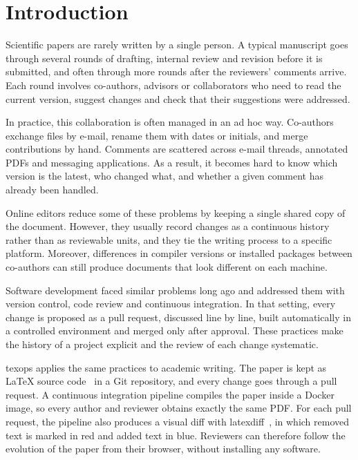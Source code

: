 \section{Introduction}
\label{sec:introduction}

Scientific papers are rarely written by a single person.
A typical manuscript goes through several rounds of drafting, internal review and revision before it is submitted, and often through more rounds after the reviewers' comments arrive.
Each round involves co-authors, advisors or collaborators who need to read the current version, suggest changes and check that their suggestions were addressed.

In practice, this collaboration is often managed in an ad hoc way.
Co-authors exchange files by e-mail, rename them with dates or initials, and merge contributions by hand.
Comments are scattered across e-mail threads, annotated PDFs and messaging applications.
As a result, it becomes hard to know which version is the latest, who changed what, and whether a given comment has already been handled.

Online editors reduce some of these problems by keeping a single shared copy of the document.
However, they usually record changes as a continuous history rather than as reviewable units, and they tie the writing process to a specific platform.
Moreover, differences in compiler versions or installed packages between co-authors can still produce documents that look different on each machine.

Software development faced similar problems long ago and addressed them with version control, code review and continuous integration.
In that setting, every change is proposed as a pull request, discussed line by line, built automatically in a controlled environment and merged only after approval.
These practices make the history of a project explicit and the review of each change systematic.

texops applies the same practices to academic writing.
The paper is kept as \LaTeX{} source code~\cite{lamport1994latex} in a Git repository, and every change goes through a pull request.
A continuous integration pipeline compiles the paper inside a Docker image, so every author and reviewer obtains exactly the same PDF.
For each pull request, the pipeline also produces a visual diff with latexdiff~\cite{latexdiff}, in which removed text is marked in red and added text in blue.
Reviewers can therefore follow the evolution of the paper from their browser, without installing any software.

